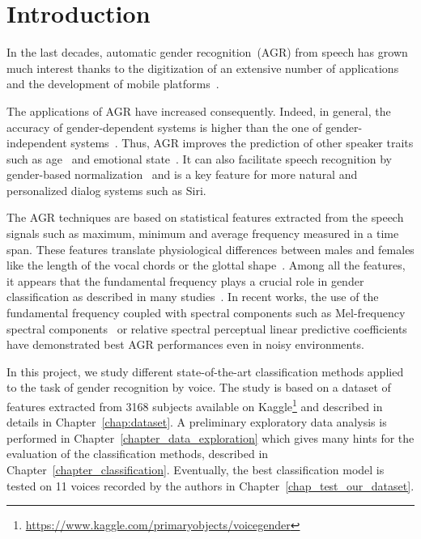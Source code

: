

\chapter{Introduction}
\label{chap:introduction}

In the last decades, automatic gender recognition~(AGR) from speech has grown much interest thanks to the digitization of an extensive number of applications and the development of mobile platforms~\cite{Wu_JASA_1991, Wu_JASA_1991_2, Childers_ICASSP_1988, Harb2005, Zeng2006, Sorokin2008, Metze_ICASSP_2007, Bocklet_ICASSP_2008}.

The applications of AGR have increased consequently. Indeed, in general, the accuracy of gender-dependent systems is higher than the one of gender-independent systems~\cite{Harb2005}. Thus, AGR improves the prediction of other speaker traits such as age~\cite{Levi2015} and emotional state~\cite{Bisio2013, Ververidis2004}. It can also facilitate speech recognition by gender-based normalization~\cite{Wegmann_ICASSP_1996} and is a key feature for more natural and personalized dialog systems such as Siri.

The AGR techniques are based on statistical features extracted from the speech signals such as maximum, minimum and average frequency measured in a time span. These features translate physiological differences between males and females like the length of the vocal chords or the glottal shape~\cite{Titze_JASA_1989}. Among all the features, it appears that the fundamental frequency plays a crucial role in gender classification as described in many studies~\cite{Hollien1967, Wu_JASA_1991, Poon2015}. In recent works, the use of the fundamental frequency coupled with spectral components such as Mel-frequency spectral components~\cite{Gupta2016} or relative spectral perceptual linear predictive coefficients~\cite{Zeng2006} have demonstrated best AGR performances even in noisy environments.

In this project, we study different state-of-the-art classification methods applied to the task of gender recognition by voice. The study is based on a dataset of features extracted from \num{3168} subjects available on Kaggle\footnote{\url{https://www.kaggle.com/primaryobjects/voicegender}} and described in details in Chapter~\ref{chap:dataset}. A preliminary exploratory data analysis is performed in Chapter~\ref{chapter_data_exploration} which gives many hints for the evaluation of the classification methods, described in Chapter~\ref{chapter_classification}. Eventually, the best classification model is tested on \num{11} voices recorded by the authors in Chapter~\ref{chap_test_our_dataset}.
  